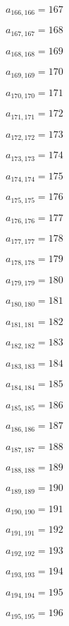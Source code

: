 \documentclass[a4paper,12pt]{article}
\begin{document}
$a _{ 166, 166 } = 167$

$a _{ 167, 167 } = 168$

$a _{ 168, 168 } = 169$

$a _{ 169, 169 } = 170$

$a _{ 170, 170 } = 171$

$a _{ 171, 171 } = 172$

$a _{ 172, 172 } = 173$

$a _{ 173, 173 } = 174$

$a _{ 174, 174 } = 175$

$a _{ 175, 175 } = 176$

$a _{ 176, 176 } = 177$

$a _{ 177, 177 } = 178$

$a _{ 178, 178 } = 179$

$a _{ 179, 179 } = 180$

$a _{ 180, 180 } = 181$

$a _{ 181, 181 } = 182$

$a _{ 182, 182 } = 183$

$a _{ 183, 183 } = 184$

$a _{ 184, 184 } = 185$

$a _{ 185, 185 } = 186$

$a _{ 186, 186 } = 187$

$a _{ 187, 187 } = 188$

$a _{ 188, 188 } = 189$

$a _{ 189, 189 } = 190$

$a _{ 190, 190 } = 191$

$a _{ 191, 191 } = 192$

$a _{ 192, 192 } = 193$

$a _{ 193, 193 } = 194$

$a _{ 194, 194 } = 195$

$a _{ 195, 195 } = 196$
\end{document}
